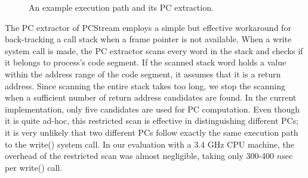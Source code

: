 \begin{figure}[b]
	\centering
	\hfill
	\caption{An example execution path and its PC extraction.} %
	\label{fig:getpc}
\end{figure}

The PC extractor of \textsf{\small PCStream} employs a simple but effective
workaround for back-tracking a call stack when a frame pointer is not
available.  When a write system call is made, the PC extractor scans every word
in the stack and checks if it belongs to process's code segment.  If the
scanned stack word holds a value within the address range of the code segment,
it assumes that it is a return address.  Since scanning the entire stack takes
too long, we stop the scanning when a sufficient number of return address
candidates are found. In the current implementation, only five candidates are
used for PC computation.  Even though it is quite ad-hoc, this restricted scan
is effective in distinguishing different PCs; it is very unlikely that two
different PCs follow exactly the same execution path to the \textsf{\small
write()} system call.  In our evaluation with a 3.4 GHz CPU machine, the
overhead of the restricted scan was almost negligible, taking only 300-400
$n$sec per \textsf{\small write()} call.

